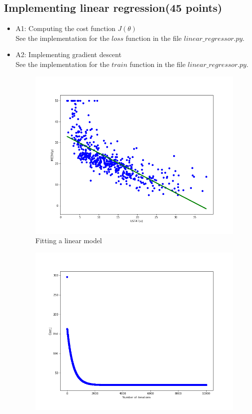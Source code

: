 \documentclass{article}
\begin{document}
\subsection{Implementing linear regression(45 points)}
\begin{itemize}
    \item A1: Computing the cost function $J(\theta)$\\
    See the implementation for the $loss$ function in the file $linear\_regressor.py$.
    \item A2: Implementing gradient descent\\
    See the implementation for the $train$ function in the file $linear\_regressor.py$.\\
\begin{figure}[h!]
	\centering
	\includegraphics[scale = 0.3]{gradient_descent.png}
	\caption{Fitting a linear model}
\end{figure}
\begin{figure}[h!]
	\centering
	\includegraphics[scale = 0.3]{J_history.png}

\end{figure}
\end{itemize}
\end{document}
